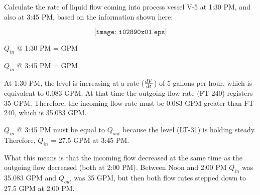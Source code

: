 

Calculate the rate of liquid flow coming into process vessel V-5 at 1:30 PM, and also at 3:45 PM, based on the information shown here:

$$\texttt{[image: i02890x01.eps]}$$

$Q_{in}$ @ 1:30 PM = \underbar{\hskip 50pt} GPM

\vskip 10pt

$Q_{in}$ @ 3:45 PM = \underbar{\hskip 50pt} GPM

\vskip 10pt







At 1:30 PM, the level is increasing at a rate ($dV \over dt$) of 5 gallons per hour, which is equivalent to 0.083 GPM.  At that time the outgoing flow rate (FT-240) registers 35 GPM.  Therefore, the incoming flow rate must be 0.083 GPM greater than FT-240, which is 35.083 GPM.

\vskip 10pt

$Q_{in}$ @ 3:45 PM must be equal to $Q_{out}$ because the level (LT-31) is holding steady.  Therefore, $Q_{in}$ = 27.5 GPM at 3:45 PM.

\vskip 10pt

What this means is that the incoming flow decreased at the same time as the outgoing flow decreased (both at 2:00 PM).  Between Noon and 2:00 PM $Q_{in}$ was 35.083 GPM and $Q_{out}$ was 35 GPM, but then both flow rates stepped down to 27.5 GPM at 2:00 PM.











